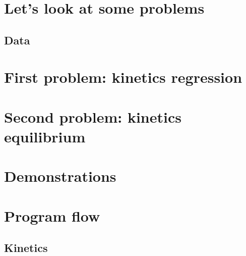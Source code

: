 \documentclass{article}
\begin{document}
\section{Let's look at some problems}
\subsection{Data}


\section{First problem: kinetics regression}


\section{Second problem: kinetics equilibrium}


\appendix
\section{Demonstrations}
\label{demo}


\section{Program flow}
\label{progflow}
\subsection{Kinetics}
\label{progflow:kinetics}

\end{document}
